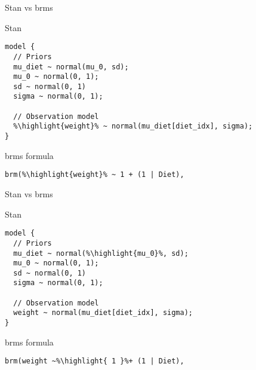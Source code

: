 \documentclass[finnish,english,t]{beamer}
\newcommand{\reducedstrut}{\vrule width 0pt height .9\ht\strutbox depth .9\dp\strutbox\relax}
\newcommand{\highlight}[1]{%
  \begingroup
  \setlength{\fboxsep}{0pt}%
  \colorbox{yellow!30}{\reducedstrut\detokenize{#1}\/}%
  \endgroup
}
\begin{document}
\begin{frame}[fragile]{Stan vs brms}

  \vspace{-0.5\baselineskip}

  Stan
  
\vspace{-0.5\baselineskip}
{\small
\begin{verbatim}
model {
  // Priors
  mu_diet ~ normal(mu_0, sd);
  mu_0 ~ normal(0, 1);
  sd ~ normal(0, 1)
  sigma ~ normal(0, 1);
  
  // Observation model
  %\highlight{weight}% ~ normal(mu_diet[diet_idx], sigma);
}
\end{verbatim}

\vspace{-\baselineskip}
{\color{lightgray}\hrulefill}

  brms formula
  \vspace{-0.5\baselineskip}
\begin{verbatim}  
brm(%\highlight{weight}% ~ 1 + (1 | Diet),
\end{verbatim}
}

\end{frame}

\begin{frame}[fragile]{Stan vs brms}

  \vspace{-0.5\baselineskip}

  Stan
  
\vspace{-0.5\baselineskip}
{\small
\begin{verbatim}
model {
  // Priors
  mu_diet ~ normal(%\highlight{mu_0}%, sd);
  mu_0 ~ normal(0, 1);
  sd ~ normal(0, 1)
  sigma ~ normal(0, 1);
  
  // Observation model
  weight ~ normal(mu_diet[diet_idx], sigma);
}
\end{verbatim}

\vspace{-\baselineskip}
{\color{lightgray}\hrulefill}

brms formula
  \vspace{-0.5\baselineskip}
\begin{verbatim}  
brm(weight ~%\highlight{ 1 }%+ (1 | Diet),
\end{verbatim}
}

\end{frame}
\end{document}
